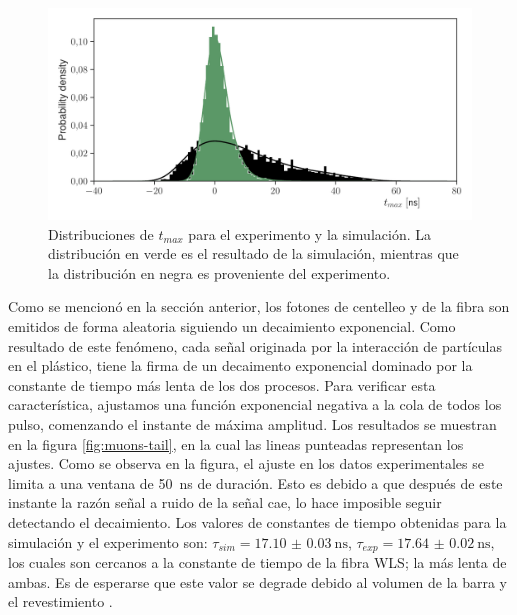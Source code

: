 \begin{figure}
        \centering
        \includegraphics[width=\textwidth]{tmax_dist.pdf}
        \caption{Distribuciones de $t_{max}$ para el experimento y la simulación. La distribución en verde es el resultado de la simulación, mientras que la distribución en negra es proveniente del experimento.}
        \label{fig:tmax}
\end{figure}

Como se mencionó en la sección anterior, los fotones de centelleo y de la fibra son emitidos de forma aleatoria siguiendo un decaimiento exponencial. Como resultado de este fenómeno, cada señal originada por la interacción de partículas en el plástico, tiene la firma de un decaimento exponencial dominado por la constante de tiempo más lenta de los dos procesos. Para verificar esta característica, ajustamos una función exponencial negativa a la cola de todos los pulso, comenzando el instante de máxima amplitud. Los resultados se muestran en la figura \ref{fig:muons-tail}, en la cual las lineas punteadas representan los ajustes. Como se observa en la figura, el ajuste en los datos experimentales se limita a una ventana de \SI{50}{\ns} de duración. Esto es debido a que después de este instante la razón señal a ruido de la señal cae, lo hace imposible seguir detectando el decaimiento. Los valores de constantes de tiempo obtenidas para la simulación y el experimento son: $\tau_{sim}=\SI{17.10(3)}{\ns}$, $\tau_{exp}=\SI{17.64(2)}{\ns}$, los cuales son cercanos a la constante de tiempo de la fibra WLS; la más lenta de ambas. Es de esperarse que este valor se degrade debido al volumen de la barra y el revestimiento \cite{gros18}.

